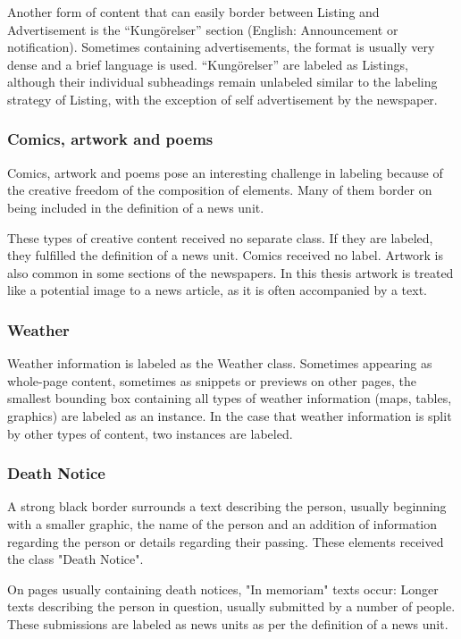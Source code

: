 \documentclass[oneside, english, bibtex]{kththesis}
\begin{document}
Another form of content that can easily border between Listing and Advertisement is the “Kungörelser” section (English: Announcement or notification).
Sometimes containing advertisements, the format is usually very dense and a brief language is used.
“Kungörelser” are labeled as Listings,
although their individual subheadings remain unlabeled similar to the labeling strategy of Listing,
with the exception of self advertisement by the newspaper.

\subsubsection{Comics, artwork and poems}
Comics, artwork and poems pose an interesting challenge in labeling because of the creative freedom of the composition of elements.
Many of them border on being included in the definition of a news unit.

These types of creative content received no separate class. If they are labeled, they fulfilled the definition of a news unit. Comics received no label.
Artwork is also common in some sections of the newspapers. In this thesis artwork is treated like a potential image to a news article, as it is often accompanied by a text.

\subsubsection{Weather}

Weather information is labeled as the Weather class.
Sometimes appearing as whole-page content, sometimes as snippets or previews on other pages, the smallest bounding box containing all types of weather information (maps, tables, graphics) are labeled as an instance.
In the case that weather information is split by other types of content, two instances are labeled.

\subsubsection{Death Notice}

A strong black border surrounds a text describing the person, usually beginning with a smaller graphic,
the name of the person and an addition of information regarding the person or details regarding their passing. These elements received the class "Death Notice".

On pages usually containing death notices, "In memoriam" texts occur: Longer texts describing the person in question, usually submitted by a number of people.
These submissions are labeled as news units as per the definition of a news unit.
\end{document}
